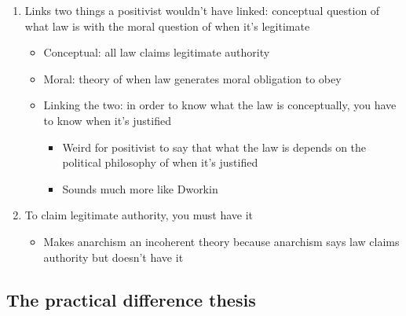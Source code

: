 \begin{itemize}
  \begin{enumerate}
  \def\labelenumi{\arabic{enumi}.}
  \tightlist
  \item
    Links two things a positivist wouldn't have linked: conceptual
    question of what law is with the moral question of when it's
    legitimate

    \begin{itemize}
    \tightlist
    \item
      Conceptual: all law claims legitimate authority
    \item
      Moral: theory of when law generates moral obligation to obey
    \item
      Linking the two: in order to know what the law is conceptually,
      you have to know when it's justified

      \begin{itemize}
      \tightlist
      \item
        Weird for positivist to say that what the law is depends on the
        political philosophy of when it's justified
      \item
        Sounds much more like Dworkin
      \end{itemize}
    \end{itemize}
  \item
    To claim legitimate authority, you must have it

    \begin{itemize}
    \tightlist
    \item
      Makes anarchism an incoherent theory because anarchism says law
      claims authority but doesn't have it
    \end{itemize}
  \end{enumerate}
\end{itemize}

\hypertarget{the-practical-difference-thesis}{%
\subsection{The practical difference
thesis}\label{the-practical-difference-thesis}}


